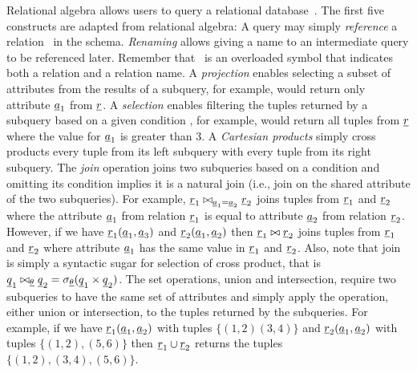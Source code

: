 Relational algebra allows users to query a relational database~\cite{AliceBook}.
%
The first five constructs are adapted from relational algebra:
%
A query may simply \emph{reference} a relation \pRel\ in the schema.
\emph{Renaming} allows giving a name to an intermediate query to be referenced
 later. Remember that \pRel\ is an overloaded symbol that indicates both a relation
 and a relation name. 
%
A \emph{projection} enables selecting a subset of attributes from the results
of a subquery, for example, \vPrj[\pAtt_1]{\pRel} would return only attribute $\pAtt_1$
from $\pRel$.
%
A \emph{selection} enables filtering the tuples returned by a subquery based on a
given condition \pCond, for example, \vSel[\pAtt_1 > 3]{\pRel} would return all tuples
from $\pRel$ where the value for $\pAtt_1$ is greater than 3.
%
A \emph{Cartesian products} simply cross products every tuple from its
left subquery with every tuple from its right subquery. 
%
The \emph{join} operation joins two subqueries based on a condition and
omitting its condition implies it is a natural join (i.e., join on the
shared attribute of the two subqueries).
For example, $\pRel_1 \bowtie_{\pAtt_1 = \pAtt_2} \pRel_2$ joins tuples from $\pRel_1$ 
and $\pRel_2$ where the attribute $\pAtt_1$ from relation $\pRel_1$ is equal to
attribute $\pAtt_2$ from relation $\pRel_2$. However, if we have $\pRel_1(\pAtt_1, \pAtt_3)$
and $\pRel_2 (\pAtt_1, \pAtt_2)$ then
$\pRel_1 \bowtie \pRel_2$ joins tuples from $\pRel_1$ and $\pRel_2$ where
attribute $\pAtt_1$ has the same value in $\pRel_1$ and $\pRel_2$. 
%
Also, note that join is simply a syntactic sugar for selection of cross product,
that is $\pQ_1 \bowtie_{\pCond} \pQ_2 = \vSel [\pCond] {(\pQ_1 \times \pQ_2)}$.
%
The set operations, union and intersection, require two subqueries to have the same set of attributes
and simply apply the operation, either union or intersection, to the tuples returned by
the subqueries.
For example, if we have $\pRel_1(\pAtt_1, \pAtt_2)$ with 
tuples $\{(1,2)(3,4)\}$
and $\pRel_2(\pAtt_1, \pAtt_2)$ with tuples $\{(1,2),(5,6) \}$
then $\pRel_1 \cup \pRel_2 $ returns the tuples $\{(1,2), (3,4), (5,6)\}$.

%
